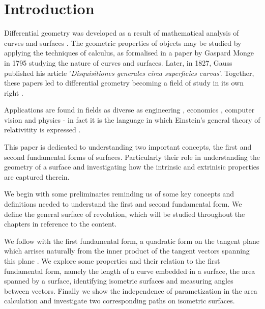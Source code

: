 \documentclass{UKZNcomp}
\theoremstyle{definition}
\theoremstyle{remark}
\begin{document}
 \frontmatter

 \makepreliminarypages

 \singlespace

 \tableofcontents


 \listoffigures


 \mainmatter


\chapter{Introduction}


Differential geometry was developed as a result of mathematical analysis of curves and surfaces \cite{encyclopediaofmath}. The geometric properties of objects may be studied by applying the techniques of calculus, as formalised in a paper by Gaspard Monge in 1795 studying the nature of curves and surfaces. Later, in 1827, Gauss published his article '\textit{Disquisitiones generales circa superficies curvas}'. Together, these papers led to differential geometry becoming a field of study in its own right \cite{Gauss1827}. 

Applications are found in fields as diverse as engineering \cite{Manton2005}, economics \cite{Marriott2000}, computer vision \cite{Micheli2008} and physics - in fact it is the language in which Einstein's general theory of relativitity is expressed \cite{Waner}. 


This paper is dedicated to understanding two important concepts, the first and second fundamental forms of surfaces. Particularly their role in understanding the geometry of a surface and investigating how the intrinsic and extrinisic properties are captured therein.

We begin with some preliminaries reminding us of some key concepts and definitions needed to understand the first and second fundamental form. We define the general surface of revolution, which will be studied throughout the chapters in reference to the content. 

We follow with the first fundamental form, a quadratic form on the tangent plane which arrises naturally from the inner product of the tangent vectors spanning this plane \cite{Weisstein}. We explore some properties and their relation to the first fundamental form, namely the length of a curve embedded in a surface, the area spanned by a surface, identifying isometric surfaces and measuring angles between vectors. Finally we show the independence of parametization in the area calculation and investigate two corresponding paths on isometric surfaces.
\end{document}
